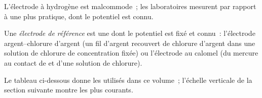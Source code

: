 L'électrode à hydrogène est malcommode~; les laboratoires mesurent par
rapport à une  plus pratique, dont le potentiel est connu.

\begin{definition}\label{def:b1:nernst:reference-electrode}
Une \emph{électrode de référence} est une 
dont le potentiel est fixé et connu~: l'électrode argent--chlorure
d'argent (un fil d'argent recouvert de chlorure d'argent dans une
solution de chlorure de concentration fixée) ou l'électrode au calomel
(du mercure au contact de  et d'une solution de chlorure).
\end{definition}

Le tableau ci-dessous donne les  utilisés dans ce
volume~; l'échelle verticale de la section suivante montre les plus
courants.

